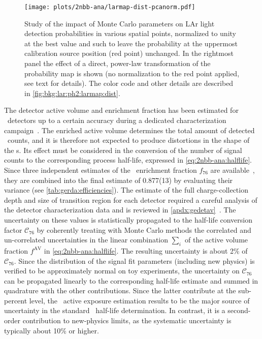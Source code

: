 \begin{description}[wide]
    \begin{figure}
      \centering
      \texttt{[image: plots/2nbb-ana/larmap-dist-pcanorm.pdf]}
      \caption{%
        Study of the impact of Monte Carlo parameters on LAr light detection probabilities in
        various spatial points, normalized to unity at the best value and such to leave the
        probability at the uppermost calibration source position (red point) unchanged. In
        the rightmost panel the effect of a direct, power-law transformation of the
        probability map is shown (no normalization to the red point applied, see text for
        details). The color code and other details are described in
        \cref{fig:bkg:lar:ph2:larmap:dist}.
      }\label{fig:2nbb-ana:dist-pcanorm}
    \end{figure}

  \item[\gesix\ active exposure] The detector active volume and enrichment fraction has
    been estimated for \bege\ detectors up to a certain accuracy during a dedicated
    characterization campaign~\cite{Agostini2015e, Agostini2019}. The enriched active
    volume determines the total amount of detected \nnbb\ counts, and it is therefore not
    expected to produce distortions in the shape of the \pdf{}s. Its effect must be
    considered in the conversion of the number of signal counts to the corresponding
    process half-life, expressed in \cref{eq:2nbb-ana:halflife}.  Since three independent
    estimates of the \bege\ enrichment fraction $f_{76}$ are
    available~\cite{Agostini2015e}, they are combined into the final estimate of 0.877(13)
    by evaluating their variance (see \cref{tab:gerda:efficiencies}). The estimate of the
    full charge-collection depth and size of transition region for each detector required
    a careful analysis of the detector characterization data and is reviewed in
    \cref{apdx:gedetav}~\cite{Agostini2019, Lehnert2016}. The uncertainty on these values
    is statistically propagated to the half-life conversion factor $\mathcal{C}_{76}$ by
    coherently treating with Monte Carlo methods the correlated and un-correlated
    uncertainties in the linear combination $\sum_i$ of the active volume fraction
    $f^\text{AV}$ in \cref{eq:2nbb-ana:halflife}. The resulting uncertainty is about 2\%
    of $\mathcal{C}_{76}$. Since the distribution of the signal fit parameters (including
    new physics) is verified to be approximately normal on toy experiments, the
    uncertainty on $\mathcal{C}_{76}$ can be propagated linearly to the corresponding
    half-life estimate and summed in quadrature with the other contributions. Since the
    latter contribute at the sub-percent level, the \gesix\ active exposure estimation
    results to be the major source of uncertainty in the standard \nnbb\ half-life
    determination. In contrast, it is a second-order contribution to new-physics limits,
    as the systematic uncertainty is typically about 10\% or higher.


\end{description}
